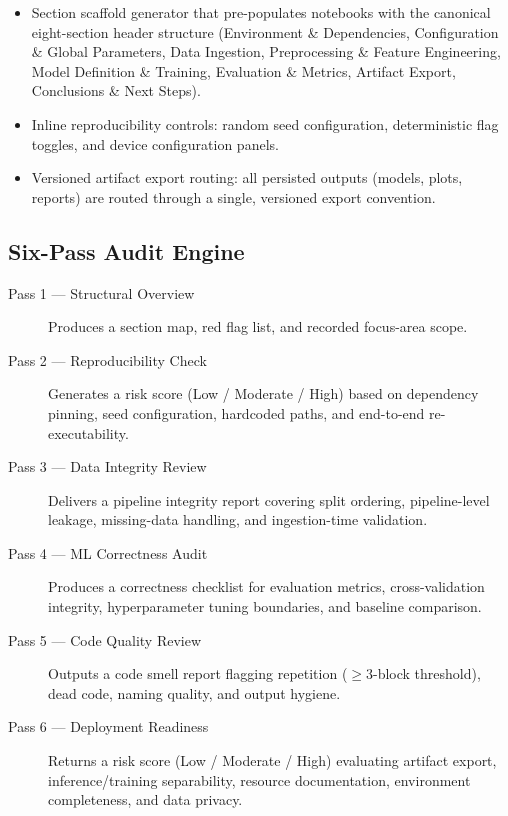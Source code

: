 \documentclass[11pt, a4paper]{article}
\begin{document}
\begin{itemize}
  \item Section scaffold generator that pre-populates notebooks with the canonical
    eight-section header structure (Environment \& Dependencies, Configuration \&
    Global Parameters, Data Ingestion, Preprocessing \& Feature Engineering, Model
    Definition \& Training, Evaluation \& Metrics, Artifact Export, Conclusions \&
    Next Steps).

  \item Inline reproducibility controls: random seed configuration, deterministic
    flag toggles, and device configuration panels.

  \item Versioned artifact export routing: all persisted outputs (models, plots,
    reports) are routed through a single, versioned export convention.
\end{itemize}

\subsection*{Six-Pass Audit Engine}

\begin{description}
  \item[Pass 1 — Structural Overview] Produces a section map, red flag list, and
    recorded focus-area scope.

  \item[Pass 2 — Reproducibility Check] Generates a risk score (Low / Moderate /
    High) based on dependency pinning, seed configuration, hardcoded paths, and
    end-to-end re-executability.

  \item[Pass 3 — Data Integrity Review] Delivers a pipeline integrity report covering
    split ordering, pipeline-level leakage, missing-data handling, and
    ingestion-time validation.

  \item[Pass 4 — ML Correctness Audit] Produces a correctness checklist for
    evaluation metrics, cross-validation integrity, hyperparameter tuning boundaries,
    and baseline comparison.

  \item[Pass 5 — Code Quality Review] Outputs a code smell report flagging
    repetition ($\ge 3$-block threshold), dead code, naming quality, and output
    hygiene.

  \item[Pass 6 — Deployment Readiness] Returns a risk score (Low / Moderate / High)
    evaluating artifact export, inference/training separability, resource
    documentation, environment completeness, and data privacy.
\end{description}
\end{document}
